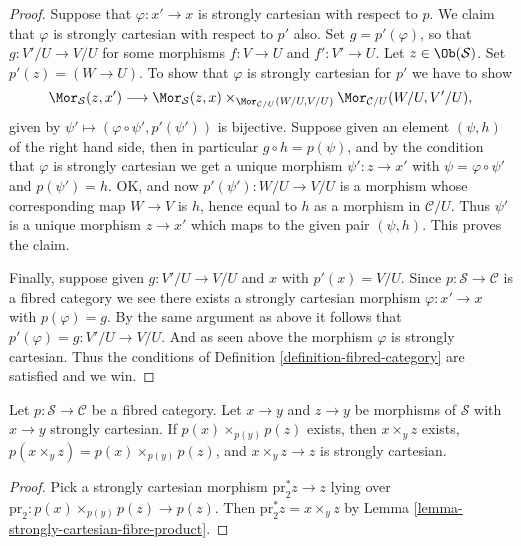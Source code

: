 \begin{proof}
Suppose that $\varphi : x' \to x$ is strongly cartesian with respect to $p$.
We claim that $\varphi$ is strongly cartesian with respect to $p'$ also.
Set $g = p'(\varphi)$, so that $g : V'/U \to V/U$
for some morphisms $f : V \to U$ and $f' : V' \to U$.
Let $z \in \Ob(\mathcal{S})$. Set $p'(z) = (W \to U)$.
To show that $\varphi$ is strongly cartesian for $p'$ we have to show
$$
\Mor_\mathcal{S}(z, x')
\longrightarrow
\Mor_\mathcal{S}(z, x)
\times_{\Mor_{\mathcal{C}/U}(W/U, V/U)}
\Mor_{\mathcal{C}/U}(W/U, V'/U),
$$
given by $\psi' \longmapsto (\varphi \circ \psi', p'(\psi'))$
is bijective. Suppose given an element $(\psi, h)$ of the
right hand side, then in particular $g \circ h = p(\psi)$,
and by the condition that $\varphi$ is strongly cartesian we
get a unique morphism $\psi' : z \to x'$ with $\psi = \varphi \circ \psi'$
and $p(\psi') = h$. OK, and now $p'(\psi') : W/U \to V/U$
is a morphism whose corresponding map $W \to V$ is $h$, hence
equal to $h$ as a morphism in $\mathcal{C}/U$. Thus $\psi'$ is
a unique morphism $z \to x'$ which maps to the given pair $(\psi, h)$.
This proves the claim.

\medskip\noindent
Finally, suppose given $g : V'/U \to V/U$ and $x$ with $p'(x) = V/U$.
Since $p : \mathcal{S} \to \mathcal{C}$ is a fibred category we
see there exists a strongly cartesian morphism $\varphi : x' \to x$
with $p(\varphi) = g$. By the same argument as above it follows
that $p'(\varphi) = g : V'/U \to V/U$. And as seen above the morphism
$\varphi$ is strongly cartesian. Thus the conditions of
Definition \ref{definition-fibred-category} are satisfied and we win.
\end{proof}

\begin{lemma}
\label{lemma-fibred-category-representable-goes-up}
Let $p : \mathcal{S} \to \mathcal{C}$ be a fibred category.
Let $x \to y$ and $z \to y$ be morphisms of $\mathcal{S}$
with $x \to y$ strongly cartesian. If $p(x) \times_{p(y)} p(z)$ exists,
then $x \times_y z$ exists, $p(x \times_y z) = p(x) \times_{p(y)} p(z)$,
and $x \times_y z \to z$ is strongly cartesian.
\end{lemma}

\begin{proof}
Pick a strongly cartesian morphism
$\text{pr}_2^*z \to z$ lying over
$\text{pr}_2 : p(x) \times_{p(y)} p(z) \to p(z)$. Then
$\text{pr}_2^*z = x \times_y z$ by
Lemma \ref{lemma-strongly-cartesian-fibre-product}.
\end{proof}





